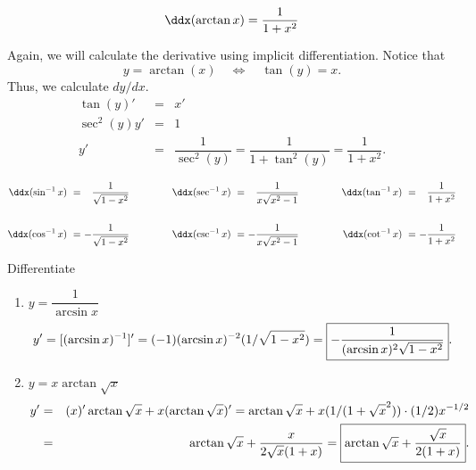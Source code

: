 \documentclass{book}
\begin{document}
\begin{Thm} \[\ddx(\arctan x) = \dfrac{1}{1+x^2}\]\end{Thm}
\begin{pf}
Again, we will calculate the derivative using implicit differentiation. Notice that \[y = \arctan (x)\quad \Longleftrightarrow\quad \tan(y) = x.\]
Thus, we calculate $dy/dx$.
\begin{eqnarray*} 
\tan(y)' &=& x'\\
\sec^2(y)y' &=& 1\\ 
y' &=& \dfrac{1}{\sec^2(y)} = \dfrac{1}{1+\tan^2(y)} = \dfrac{1}{1+x^2}.
\end{eqnarray*}
\end{pf}

\begin{Thm} 
\[\begin{alignedat}{100}
\ddx(\sin^{-1}x)\  &=\ &\dfrac{1}{\sqrt{1-x^2}}\  &\qquad\qquad& \ddx(\sec^{-1}x)\ &=\ &\dfrac{1}{x\sqrt{x^2-1}}\  &\qquad\qquad& \ddx(\tan^{-1}x)\ &=\ &\dfrac{1}{1+x^2}\\ \\
\ddx(\cos^{-1}x)\ &=\ &-\dfrac{1}{\sqrt{1-x^2}}\ && \ddx(\csc^{-1}x)\ &=\ &-\dfrac{1}{x\sqrt{x^2-1}}\   && \ddx(\cot^{-1}x)\ &=\ &-\dfrac{1}{1+x^2} 
\end{alignedat}\]
\end{Thm}\vs

\begin{Exam} Differentiate
\begin{enumerate}
\item $y =\dfrac{1}{\arcsin x}$
\[y' = [(\arcsin x)^{-1}]' = (-1)(\arcsin x)^{-2}(1/\sqrt{1-x^2}) = \fbox{$-\dfrac{1}{(\arcsin x)^2\sqrt{1-x^2}}$}. \]\vs

\item $y = x\arctan\sqrt{x}$
\begin{eqnarray*}
y' &=& (x)'\arctan\sqrt{x} + x(\arctan\sqrt{x})' = \arctan\sqrt{x} + x(1/(1+\sqrt{x}^2))\cdot (1/2)x^{-1/2}\\
&=& \arctan\sqrt{x} + \dfrac{x}{2\sqrt{x}(1+x)} = \fbox{$\arctan\sqrt{x} + \dfrac{\sqrt{x}}{2(1+x)}$}. 
\end{eqnarray*}
\end{enumerate}
\end{Exam}

\vfill
{}
\pagebreak
\end{document}
